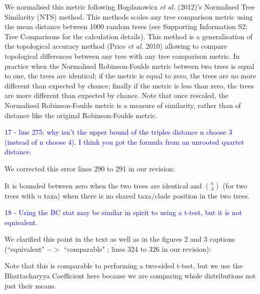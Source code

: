 \documentclass[11pt]{letter}
\begin{document}
\begin{letter}{}
\hfill\begin{minipage}{\dimexpr\textwidth-1cm}
We normalised this metric following Bogdanowicz \textit{et al.} (2012)'s Normalised Tree Similarity (NTS) method. This methods scales any tree comparison metric using the mean distance between 1000 random trees (see Supporting Information S2: Tree Comparisons for the calculation details). This method is a generalisation of the topological accuracy method (Price \textit{et al.} 2010) allowing to compare topological differences between any tree with any tree comparison metric. In practice when the Normalised Robinson-Foulds metric between two trees is equal to one, the trees are identical; if the metric is equal to zero, the trees are no more different than expected by chance; finally if the metric is less than zero, the trees are more different than expected by chance. Note that once rescaled, the Normalised Robinson-Foulds metric is a measure of similarity, rather than of distance like the original Robinson-Foulds metric. 
\end{minipage}

\textcolor{blue}{17 - line 275: why isn't the upper bound of the triples distance n choose 3 (instead of n choose 4). I think you got the formula from an unrooted quartet distance.}

We corrected this error lines 290 to 291 in our revision:

\hfill\begin{minipage}{\dimexpr\textwidth-1cm}
It is bounded between zero when the two trees are identical and $\binom{n}{3}$ (for two trees with $n$ taxa) when there is no shared taxa/clade position in the two trees.
\end{minipage}


\textcolor{blue}{18 - Using the BC stat may be similar in spirit to using a t-test, but it is not equivalent.}

We clarified this point in the text as well as in the figures 2 and 3 captions (``equivalent" $->$ ``comparable" ; lines 324 to 326 in our revision):

\hfill\begin{minipage}{\dimexpr\textwidth-1cm}
Note that this is comparable to performing a two-sided t-test, but we use the Bhattacharyya Coefficient here because we are comparing whole distributions not just their means.
\end{minipage}



\end{letter}
\end{document}
